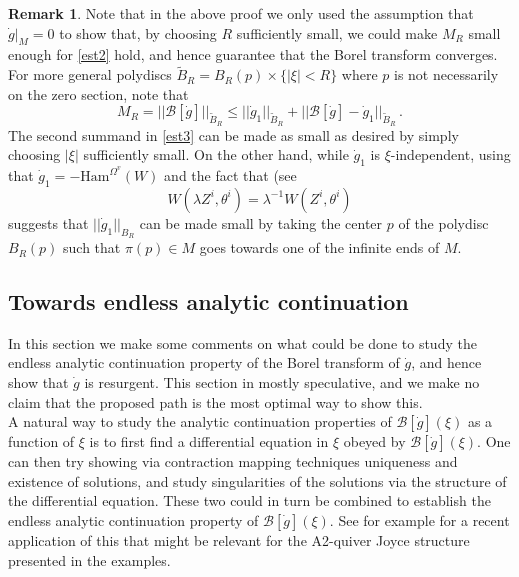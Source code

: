\documentclass{article}
\theoremstyle{definition}
\newtheorem{remark}[theorem]{Remark}
\numberwithin{equation}{section}
\begin{document}
\begin{remark}
    Note that in the above proof we only used the assumption that $\dot{g}|_M=0$ to show that, by choosing $R$ sufficiently small, we could make $M_R$ small enough for \eqref{est2} hold, and hence guarantee that the Borel transform converges. For more general polydiscs $\widetilde{B}_R=B_R(p)\times \{|\xi|<R\}$ where $p$ is not necessarily on the zero section, note that 
    \begin{equation}\label{est3}
        M_R=||\mathcal{B}[\dot{g}]||_{\widetilde{B}_R}\leq ||\dot{g}_1||_{\widetilde{B}_R}+||\mathcal{B}[\dot{g}]-\dot{g}_1||_{\widetilde{B}_R}\,.
    \end{equation}
    The second summand in \eqref{est3} can be made as small as desired by simply choosing $|\xi|$ sufficiently small. On the other hand, while $\dot{g}_1$ is $\xi$-independent, using that $\dot{g}_1=-\text{Ham}^{\Omega^{v}}(W)$ and the fact that (see \cite[Equation (45)]{TwistorJoyce} 
    \begin{equation*}
        W(\lambda Z^i,\theta^i)=\lambda^{-1}W(Z^i,\theta^i)
    \end{equation*}
    suggests that  $||\dot{g}_1||_{B_R}$ can be made small by taking the center $p$ of the polydisc $B_R(p)$ such that $\pi(p)\in M$ goes towards one of the infinite ends of $M$. 
\end{remark}
\subsection{Towards endless analytic continuation}\label{endlesssec}

In this section we make some comments on what could be done to study the endless analytic continuation property of the Borel transform of $\dot{g}$, and hence show that $\dot{g}$ is resurgent. This section in mostly speculative, and we make no claim that the proposed path is the most optimal way to show this. \\

A natural way to study the analytic continuation properties of $\mathcal{B}[\dot{g}](\xi)$  as a function of $\xi$ is to first find a differential equation in $\xi$ obeyed by $\mathcal{B}[\dot{g}](\xi)$. One can then try showing via contraction mapping techniques uniqueness and existence of solutions, and study singularities of the solutions via the structure of the differential equation. These two could in turn be combined to establish the endless analytic continuation property of $\mathcal{B}[\dot{g}](\xi)$. See for example \cite{alameddine2025resurgencetritronqueessolutionsdeformed} for a recent application of this that might be relevant for the A2-quiver Joyce structure presented in the examples. \\
\end{document}
